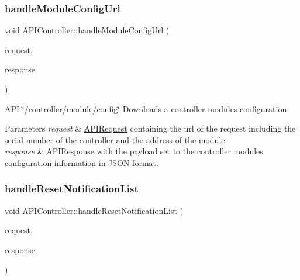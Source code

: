 \subsubsection{\texorpdfstring{handle\+Module\+Config\+Url}{handleModuleConfigUrl}}
{\footnotesize\ttfamily void A\+P\+I\+Controller\+::handle\+Module\+Config\+Url (\begin{DoxyParamCaption}\item[{const \hyperlink{class_a_p_i_request}{A\+P\+I\+Request} \&}]{request,  }\item[{\hyperlink{class_a_p_i_response}{A\+P\+I\+Response} $\ast$}]{response }\end{DoxyParamCaption})\hspace{0.3cm}{\ttfamily [slot]}}

A\+PI \char`\"{}/controller/module/config\char`\"{} Downloads a controller module\textquotesingle{}s configuration 
\begin{DoxyParams}{Parameters}
{\em request} & \hyperlink{class_a_p_i_request}{A\+P\+I\+Request} containing the url of the request including the serial number of the controller and the address of the module. \\
\hline
{\em response} & \hyperlink{class_a_p_i_response}{A\+P\+I\+Response} with the payload set to the controller module\textquotesingle{}s configuration information in J\+S\+ON format. \\
\hline
\end{DoxyParams}
\mbox{\label{class_a_p_i_controller_a9b2f08f4b0a67c0a4f6891a9d8601b93}} 
\subsubsection{\texorpdfstring{handle\+Reset\+Notification\+List}{handleResetNotificationList}}
{\footnotesize\ttfamily void A\+P\+I\+Controller\+::handle\+Reset\+Notification\+List (\begin{DoxyParamCaption}\item[{const \hyperlink{class_a_p_i_request}{A\+P\+I\+Request} \&}]{request,  }\item[{\hyperlink{class_a_p_i_response}{A\+P\+I\+Response} $\ast$}]{response }\end{DoxyParamCaption})\hspace{0.3cm}{\ttfamily [slot]}}

